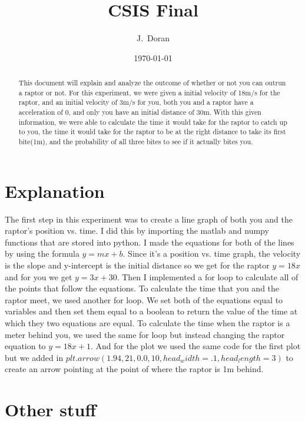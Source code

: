 \documentclass[twocolumn]{revtex4}
\begin{document}
\title{
CSIS Final
}

\author{J.~Doran}

\date{\today}

\begin{abstract}
 	This document will explain and analyze the outcome of whether or not you can outrun a raptor or not. For this experiment, we were given a initial velocity of 18m/s for the raptor, and an initial velocity of 3m/s for you, both you and a raptor have a acceleration of 0, and only you have an initial distance of 30m. With this given information, we were able to calculate the time it would take for the raptor to catch up to you, the time it would take for the raptor to be at the right distance to take its first bite(1m), and the probability of all three bites to see if it actually bites you. 
 	 
\end{abstract}

\maketitle

\section{Explanation}
	The first step in this experiment was to create a line graph of both you and the raptor's position vs. time.  I did this by importing the matlab and numpy functions that are stored into python. I made the equations for both of the lines by using the formula {\it $y=mx+b$}. Since it's a position vs. time graph, the velocity is the slope and y-intercept is the initial distance so we get for the raptor {\it $y=18x$} and for you we get {\it $y=3x+30$}. Then I implemented a for loop to calculate all of the points that follow the equations. 
	To calculate the time that you and the raptor meet, we used another for loop. We set both of the equations equal to variables and then set them equal to a boolean to return the value of the time at which they two equations are equal. 
	To calculate the time when the raptor is a meter behind you, we used the same for loop but instead changing the raptor equation to {\it $y=18x+1$}.  And for the plot we used the same code for the first plot but we added in {\it $plt.arrow(1.94,21,0.0,10,head_width=.1,head_length=3)$ } to create an arrow pointing at the point of where the raptor is 1m behind. 
	

\section{Other stuff}
\end{document}
